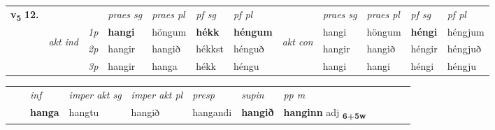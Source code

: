 \begin{tabular}{llllllllllll} \toprule
\multirow{4}{*}{{{\textbf{v{\textsubscript{5}}} \Large{\textbf{12.}}}}}  & &   &  \textit{praes sg}  & \textit{praes pl}  &\textit{ pf sg} & \textit{pf pl} &  &  \textit{praes sg}  & \textit{praes pl}  & \textit{pf sg} & \textit{pf pl } \\*
	\cmidrule{4-7} \cmidrule{9-12}
 & \multirow{3}{*}{\begin{turn}{90}\textit{akt ind}\end{turn}} & {\textit{1p}} & \textbf{hangi} & höngum    & \textbf{hékk} & \textbf{héngum} & \multirow{3}{*}{\begin{turn}{90}\textit{akt con}\end{turn}} &hangi & höngum & \textbf{héngi} & héngjum\\*
& &  {\textit{2p}} &  hangir  & hangið   & hékkst & hénguð & & hangir & hangið & héngir & héngjuð \\*
& &  {\textit{3p}} & hangir & hanga   & hékk & héngu & & hangi & hangi& héngi & héngju  \\*
\cmidrule{4-7} \cmidrule{9-12}
\end{tabular}


\begin{tabular}{llllllllllll}
 & & \textit{inf} & \textit{imper akt sg} & \textit{imper akt pl}   & \textit{presp} & \textit{supin}  & \textit{pp m}     \\*
  & & \textbf{hanga} & hangtu  & hangið   & hangandi &  \textbf{hangið}  & \textbf{hanginn} adj \textbf{\textsubscript{6+5w}} \\*
\cmidrule{1-12}
\end{tabular}



